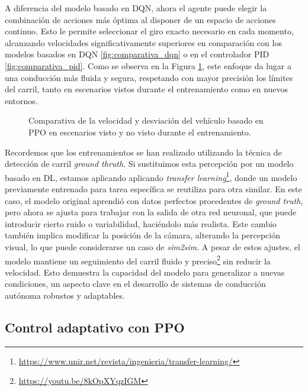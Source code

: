 A diferencia del modelo basado en \ac{DQN}, ahora el agente puede elegir la combinación de acciones más óptima al disponer de un espacio de acciones continuo. Esto le permite seleccionar el giro exacto necesario en cada momento, alcanzando velocidades significativamente superiores en comparación con los modelos basados en \ac{DQN} \ref{fig:comparativa_dqn} o en el controlador \ac{PID} \ref{fig:comparativa_pid}. Como se observa en la Figura \ref{fig:comparativa_ppo}, este enfoque da lugar a una conducción más fluida y segura, respetando con mayor precisión los límites del carril, tanto en escenarios vistos durante el entrenamiento como en nuevos entornos.

\begin{figure}[ht]
\centering
{}
\hfill
{}
\caption{Comparativa de la velocidad y desviación del vehículo basado en \ac{PPO} en escenarios visto y no visto durante el entrenamiento.}
\label{fig:comparativa_ppo}
\end{figure}

Recordemos que los entrenamientos se han realizado utilizando la técnica de detección de carril \textit{ground thruth}. Si sustituimos esta percepción por un modelo basado en \ac{DL}, estamos aplicando aplicando \textit{transfer learning}\footnote{\url{https://www.unir.net/revista/ingenieria/transfer-learning/}}, donde un modelo previamente entrenado para tarea específica se reutiliza para otra similar. En este caso, el modelo original aprendió con datos perfectos procedentes de \textit{ground truth}, pero ahora se ajusta para trabajar con la salida de otra red neuronal, que puede introducir cierto ruido o variabilidad, haciéndolo más realista. Este cambio también implica modificar la posición de la cámara, alterando la percepción visual, lo que puede considerarse un caso de \textit{sim2sim}. A pesar de estos ajustes, el modelo mantiene un seguimiento del carril fluido y preciso\footnote{\url{https://youtu.be/8kOpXYqzIGM}} sin reducir la velocidad. Esto demuestra la capacidad del modelo para generalizar a nuevas condiciones, un aspecto clave en el desarrollo de sistemas de conducción autónoma robustos y adaptables.

\subsection{Control adaptativo con PPO}

